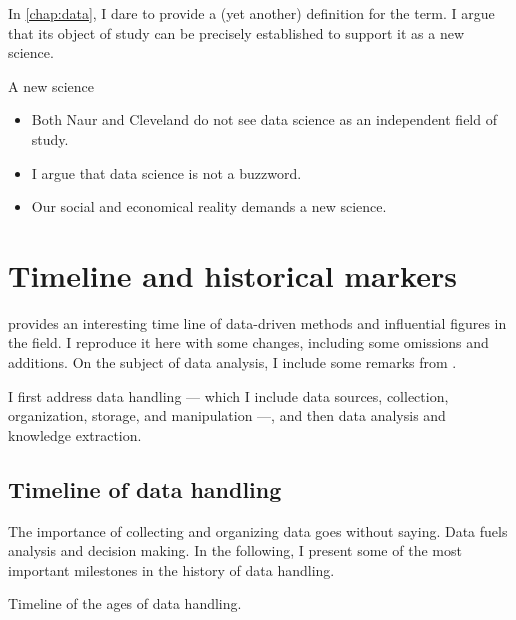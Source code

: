 In \cref{chap:data}, I dare to provide a (yet another) definition for the term.  I
argue that its object of study can be precisely established to support it as a new
science.

\begin{slidebox}{A new science}{}
  \begin{itemize}
    \item Both Naur and Cleveland do not see data science as an independent field of study.
    \item I argue that data science is not a buzzword.
    \item Our social and economical reality demands a new science.
  \end{itemize}
\end{slidebox}

\section{Timeline and historical markers}

\textcite{Kelleher2018} provides an interesting time line of data-driven methods and
influential figures in the field.  I reproduce it here with some changes, including
some omissions and additions.  On the subject of data analysis, I include some remarks
from \textcite{Vapnik1995}.

I first address data handling --- which I include data sources, collection, organization,
storage, and manipulation ---, and then data analysis and knowledge extraction.

\subsection{Timeline of data handling}

The importance of collecting and organizing data goes without saying.  Data fuels analysis and
decision making.  In the following, I present some of the most important milestones in the history
of data handling.

\begin{figurebox}[label=fig:data-handling-history]{Timeline of the ages of data handling.}
  \centering
\end{figurebox}

